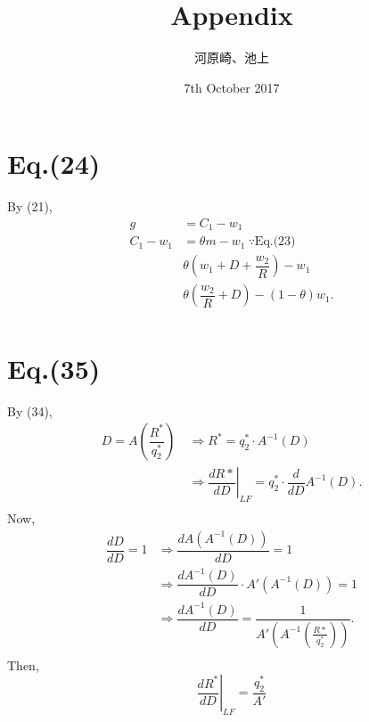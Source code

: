 \documentclass[a4paper,11pt]{article}
\title{Appendix}
\author{河原崎、池上}
\date{7th October 2017}
\begin{document}
\maketitle

\section{Eq.(24)}
	By (21),
	\begin{align*}
		 g & = C_1 - w_1 \\
		C_1 - w_1 & = \theta m - w_1 \: \because \text{Eq.(23)} \\
			& \theta \left(w_1 + D + \dfrac{w_2}{R} \right) - w_1 \\
			& \theta \left(\dfrac{w_2}{R} + D\right) - (1-\theta) w_1. \\
	\end{align*}

\section{Eq.(35)}
	By (34),
	\begin{align*}
		D = A \left( \dfrac{R^*}{q_2^*}\right) \: & \Rightarrow R^* = q_2^* \cdot A^{-1}(D) \\
			& \Rightarrow  \left. \dfrac{dR*}{dD} \right|_{LF} = q_2^* \cdot \dfrac{d}{dD} A^{-1}(D). \\
	\end{align*}
	Now,
	\begin{align*}
			\dfrac{dD}{dD} = 1& \Rightarrow  \dfrac{dA(A^{-1}(D))}{dD} = 1 \\
			& \Rightarrow \dfrac{dA^{-1}(D)}{dD} \cdot A'(A^{-1}(D)) = 1 \\
			& \Rightarrow \dfrac{dA^{-1}(D)}{dD}= \dfrac{1}{A'\left(A^{-1}\left(\frac{R*}{q_2^*}\right)\right)}. \\
	\end{align*}
	Then,
	\begin{equation*}
		\left. \dfrac{dR^*}{dD} \right|_{LF} = \dfrac{q_2^*}{A'}
	\end{equation*}
\end{document}
